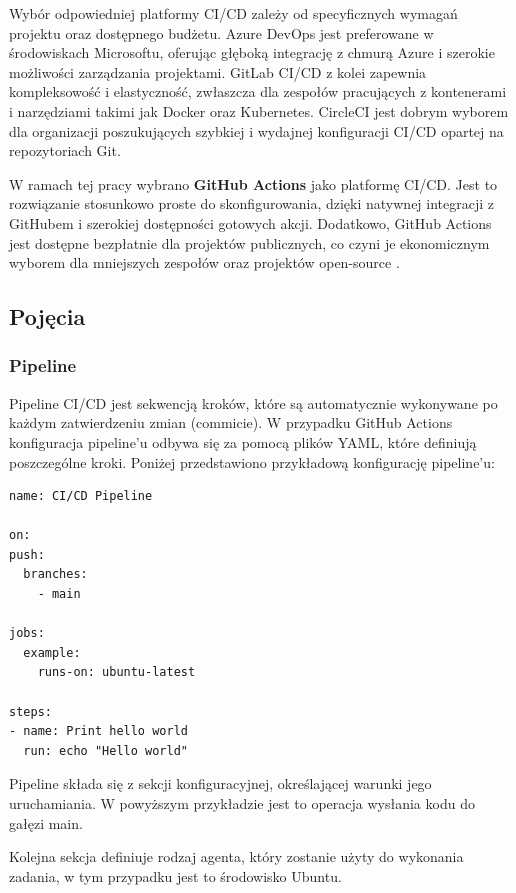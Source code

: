 \documentclass{article}
\begin{document}
Wybór odpowiedniej platformy CI/CD zależy od specyficznych wymagań projektu oraz dostępnego budżetu. Azure DevOps jest preferowane w środowiskach Microsoftu, oferując głęboką integrację z chmurą Azure i szerokie możliwości zarządzania projektami. GitLab CI/CD z kolei zapewnia kompleksowość i elastyczność, zwłaszcza dla zespołów pracujących z kontenerami i narzędziami takimi jak Docker oraz Kubernetes. CircleCI jest dobrym wyborem dla organizacji poszukujących szybkiej i wydajnej konfiguracji CI/CD opartej na repozytoriach Git. 

W ramach tej pracy wybrano \textbf{GitHub Actions} jako platformę CI/CD. Jest to rozwiązanie stosunkowo proste do skonfigurowania, dzięki natywnej integracji z GitHubem i szerokiej dostępności gotowych akcji. Dodatkowo, GitHub Actions jest dostępne bezpłatnie dla projektów publicznych, co czyni je ekonomicznym wyborem dla mniejszych zespołów oraz projektów open-source \cite{GitHubActionsImporter}.

\subsection{Pojęcia}

\subsubsection{Pipeline} \label{pipeline}

Pipeline CI/CD jest sekwencją kroków, które są automatycznie wykonywane po każdym zatwierdzeniu zmian (commicie). W przypadku GitHub Actions konfiguracja pipeline’u odbywa się za pomocą plików YAML, które definiują poszczególne kroki. Poniżej przedstawiono przykładową konfigurację pipeline'u:

\begin{lstlisting}[caption=Przykładowa konfiguracja pipeline'u w Github Actions]
name: CI/CD Pipeline

on:
push:
  branches:
    - main

jobs:
  example:
    runs-on: ubuntu-latest

steps:
- name: Print hello world
  run: echo "Hello world"

\end{lstlisting}

Pipeline składa się z sekcji konfiguracyjnej, określającej warunki jego uruchamiania. W powyższym przykładzie jest to operacja wysłania kodu do gałęzi main.

Kolejna sekcja definiuje rodzaj agenta, który zostanie użyty do wykonania zadania, w tym przypadku jest to środowisko Ubuntu.
\end{document}
